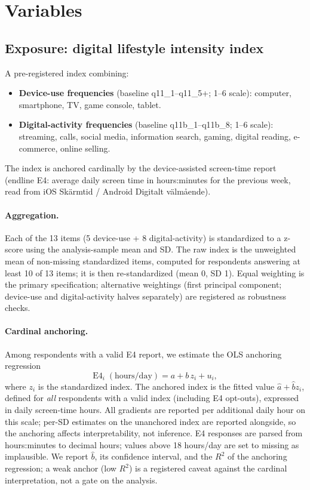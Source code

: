 \documentclass[11pt,a4paper]{article}
\begin{document}
\section{Variables}

\subsection{Exposure: digital lifestyle intensity index}
A pre-registered index combining:
\begin{itemize}
  \item \textbf{Device-use frequencies} (baseline q11\_1--q11\_5+; 1--6 scale):
    computer, smartphone, TV, game console, tablet.
  \item \textbf{Digital-activity frequencies} (baseline q11b\_1--q11b\_8; 1--6
    scale): streaming, calls, social media, information search, gaming, digital
    reading, e-commerce, online selling.
\end{itemize}
The index is anchored cardinally by the device-assisted screen-time report
(endline E4: average daily screen time in hours:minutes for the previous week,
read from iOS Sk\"armtid / Android Digitalt v\"alm\aa ende).

\paragraph{Aggregation.} Each of the 13 items (5 device-use + 8
digital-activity) is standardized to a z-score using the analysis-sample mean
and SD. The raw index is the unweighted mean of non-missing standardized items,
computed for respondents answering at least 10 of 13 items; it is then
re-standardized (mean 0, SD 1). Equal weighting is the primary specification;
alternative weightings (first principal component; device-use and
digital-activity halves separately) are registered as robustness checks.

\paragraph{Cardinal anchoring.} Among respondents with a valid E4 report, we
estimate the OLS anchoring regression
\begin{equation*}
  \text{E4}_i \;(\text{hours/day}) = a + b \, z_i + u_i,
\end{equation*}
where $z_i$ is the standardized index. The anchored index is the fitted value
$\hat{a} + \hat{b} z_i$, defined for \emph{all} respondents with a valid index
(including E4 opt-outs), expressed in daily screen-time hours. All gradients are
reported per additional daily hour on this scale; per-SD estimates on the
unanchored index are reported alongside, so the anchoring affects
interpretability, not inference. E4 responses are parsed from hours:minutes to
decimal hours; values above 18 hours/day are set to missing as implausible.
We report $\hat{b}$, its confidence interval, and the $R^2$ of the anchoring
regression; a weak anchor (low $R^2$) is a registered caveat against the
cardinal interpretation, not a gate on the analysis.
\end{document}
